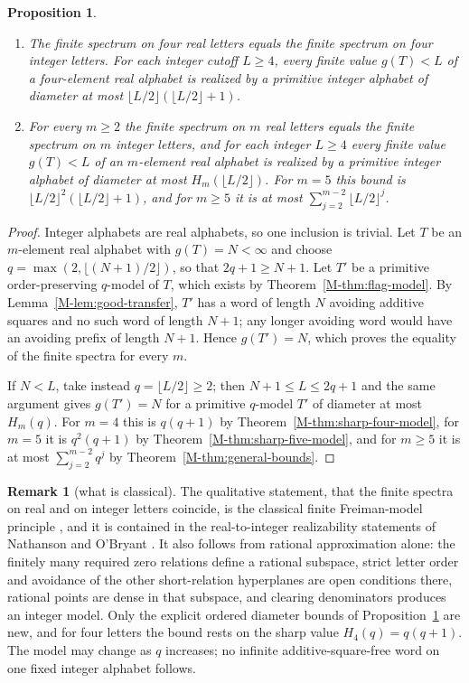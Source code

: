 \documentclass[11pt,reqno]{amsart}
\theoremstyle{plain}
\newtheorem{proposition}[theorem]{Proposition}
\theoremstyle{definition}
\newtheorem{remark}[theorem]{Remark}
\theoremstyle{plain}
\theoremstyle{plain}
\theoremstyle{plain}
\theoremstyle{plain}
\theoremstyle{plain}
\theoremstyle{plain}
\theoremstyle{definition}
\theoremstyle{definition}
\theoremstyle{definition}
\theoremstyle{plain}
\begin{document}
\begin{proposition}\label{M-prop:spectrum-transfer}
\leavevmode
\begin{enumerate}
\item The finite spectrum on four real letters equals the finite spectrum
 on four integer letters. For each integer cutoff $L\ge4$, every finite
 value $g(T)<L$ of a four-element real alphabet is realized by a primitive
 integer alphabet of diameter at most
 $\lfloor L/2\rfloor(\lfloor L/2\rfloor+1)$.
\item For every $m\ge2$ the finite spectrum on $m$ real letters equals the
 finite spectrum on $m$ integer letters, and for each integer $L\ge4$ every
 finite value $g(T)<L$ of an $m$-element real alphabet is realized by a
 primitive integer alphabet of diameter at most $H_m(\lfloor L/2\rfloor)$.
 For $m=5$ this bound is $\lfloor L/2\rfloor^2(\lfloor L/2\rfloor+1)$, and
 for $m\ge5$ it is at most $\sum_{j=2}^{m-2}\lfloor L/2\rfloor^j$.
\end{enumerate}
\end{proposition}
\begin{proof}
Integer alphabets are real alphabets, so one inclusion is trivial. Let $T$
be an $m$-element real alphabet with $g(T)=N<\infty$ and choose
$q=\max(2,\lfloor(N+1)/2\rfloor)$, so that $2q+1\ge N+1$. Let $T'$ be a
primitive order-preserving $q$-model of $T$, which exists by
Theorem~\ref{M-thm:flag-model}. By Lemma~\ref{M-lem:good-transfer}, $T'$ has a
word of length $N$ avoiding additive squares and no such word of length
$N+1$; any longer avoiding word would have an avoiding prefix of length $N+1$. Hence $g(T')=N$,
which proves the equality of the finite spectra for every $m$.

If $N<L$, take instead $q=\lfloor L/2\rfloor\ge2$; then $N+1\le L\le2q+1$
and the same argument gives $g(T')=N$ for a primitive $q$-model $T'$ of
diameter at most $H_m(q)$. For $m=4$ this is $q(q+1)$ by
Theorem~\ref{M-thm:sharp-four-model}, for $m=5$ it is $q^2(q+1)$ by
Theorem~\ref{M-thm:sharp-five-model}, and for $m\ge5$ it is at most
$\sum_{j=2}^{m-2}q^j$ by Theorem~\ref{M-thm:general-bounds}.
\end{proof}

\begin{remark}[what is classical]\label{M-rem:transfer-classical}
The qualitative statement, that the finite spectra on real and on integer
letters coincide, is the classical finite Freiman-model principle
\cite[Part~II]{M-GR09}, and it is contained in the
real-to-integer realizability statements of Nathanson \cite{M-Nat18} and
O'Bryant \cite{M-OBr25}. It also follows from rational approximation alone:
the finitely many required zero relations define a rational subspace,
strict letter order and avoidance of the other short-relation hyperplanes
are open conditions there, rational points are dense in that subspace, and
clearing denominators produces an integer model. Only the explicit ordered
diameter bounds of Proposition~\ref{M-prop:spectrum-transfer} are new, and
for four letters the bound rests on the sharp value $H_4(q)=q(q+1)$. The
model may change as $q$ increases; no infinite additive-square-free word on one fixed
integer alphabet follows.
\end{remark}
\end{document}
